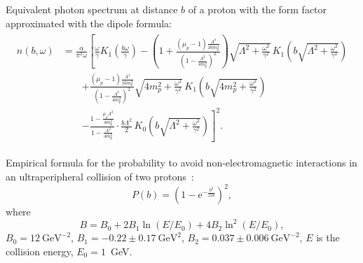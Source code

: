 \documentclass[a4paper,12pt]{article}
\begin{document}
Equivalent photon spectrum at distance $b$ of a proton with the form factor
approximated with the dipole formula:
\begin{multline}
  \begin{split}
    n(b, \omega)
    &= \frac{\alpha}{\pi^2 \omega}
       \left[
           \frac{\omega}{\gamma} K_1 \left( \frac{b \omega}{\gamma} \right)
         - \left(
               1
             + \frac{(\mu_p - 1) \frac{\Lambda^4}{16 m_p^4}}{
                 \left( 1 - \frac{\Lambda^2}{4 m_p^2} \right)^2
               }
           \right)
           \sqrt{\Lambda^2 + \frac{\omega^2}{\gamma^2}}
           \, K_1 \left( b \sqrt{\Lambda^2 + \frac{\omega^2}{\gamma^2}} \right)
    \right. \\ &\qquad \left.
         + \frac{(\mu_p - 1) \frac{\Lambda^4}{16 m_p^4}}{
             \left( 1 - \frac{\Lambda^2}{4 m_p^2}  \right)^2
           }
           \sqrt{4 m_p^2 + \frac{\omega^2}{\gamma^2}}
           \, K_1 \left( b \sqrt{4 m_p^2 + \frac{\omega^2}{\gamma^2}} \right)
    \right. \\ &\qquad \left.
         - \frac{1 - \frac{\mu_p \Lambda^2}{4 m_p^2}}
                {1 - \frac{\Lambda^2}{4 m_p^2}}
         \cdot
           \frac{b \Lambda^2}{2}
           \, K_0 \left( b \sqrt{\Lambda^2 + \frac{\omega^2}{\gamma^2}} \right)
       \right]^2.
  \end{split}
\end{multline}

Empirical formula for the probability to avoid non-electromagnetic interactions
in an ultraperipheral collision of two protons~\cite{hep-ph-0608271}:
\begin{equation}
  P(b) = \left( 1 - \mathrm{e}^{-\frac{b^2}{2B}} \right)^2,
\end{equation}
where~\cite{1112.3243}
\begin{equation}
  B = B_0 + 2 B_1 \ln(E / E_0) + 4 B_2 \ln^2 (E / E_0),
\end{equation}
$B_0 = 12~\text{GeV}^{-2}$, $B_1 = -0.22 \pm 0.17~\text{GeV}^2$, $B_2 = 0.037
\pm 0.006~\text{GeV}^{-2}$, $E$ is the collision energy, $E_0 = 1$~GeV.
\end{document}
